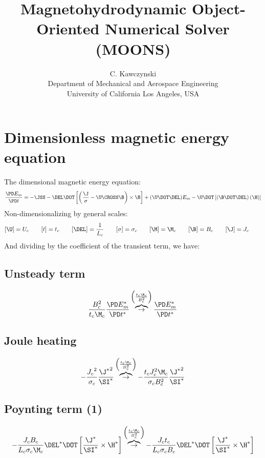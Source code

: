 \documentclass[11pt]{article}
\newcommand{\OB}{\overbrace{\rightarrow}^{\left(\frac{t_c \M_c}{B_c^2}\right)}}
\begin{document}
\doublespacing
\title{Magnetohydrodynamic Object-Oriented Numerical Solver (MOONS)}
\author{C. Kawczynski \\
Department of Mechanical and Aerospace Engineering \\
University of California Los Angeles, USA\\
}
\maketitle

\section{Dimensionless magnetic energy equation}
The dimensional magnetic energy equation:
\begin{equation}
	\frac{\PD E_m}{\PD t} =
	- \JSS
	- \DEL \DOT \left[\left(\frac{\J}{\sigma} - \U \CROSS \B \right) \times \H \right]
	+ (\U \DOT \DEL) E_m
	- \U \DOT \left[(\B \DOT \DEL) \left( \H \right) \right]
\end{equation}
Non-dimensionalizing by general scales:
\begin{equation}\begin{aligned}
	[\U] = U_c \qquad
	[t] = t_c \qquad
	[\DEL] = \frac{1}{L_c} \qquad
	[\sigma] = \sigma_c \qquad
	[\M] = \M_c \qquad
	[\B] = B_c \qquad
	[\J] = J_c \qquad
\end{aligned}\end{equation}
And dividing by the coefficient of the transient term, we have:
\subsection{Unsteady term}
\begin{equation}
	\frac{B_c^2}{t_c \M_c} \frac{\PD E_m^*}{\PD t^*} 
	\OB
	\frac{\PD E_m^*}{\PD t^*}
\end{equation}
\subsection{Joule heating}
\begin{equation}
	- \frac{{J_c}^2}{\sigma_c} \frac{{\J^*}^2}{\SI^*}
	\OB
	- \frac{t_c J_c^2 \M_c}{\sigma_c B_c^2} \frac{{\J^*}^2}{\SI^*}
\end{equation}
\subsection{Poynting term (1)}
\begin{equation}
	- \frac{J_c B_c}{L_c \sigma_c \M_c} \DEL^* \DOT \left[\frac{\J^*}{\SI^*} \times \H^* \right]
	\OB
	- \frac{J_c t_c}{L_c \sigma_c B_c} \DEL^* \DOT \left[\frac{\J^*}{\SI^*} \times \H^* \right]
\end{equation}
\end{document}
